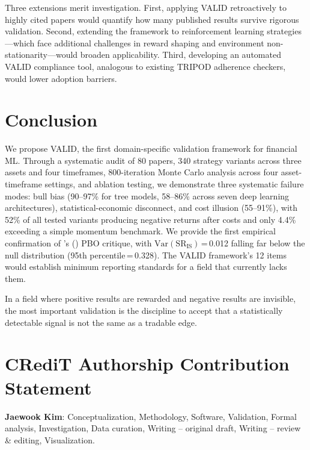\documentclass[preprint,12pt,authoryear]{elsarticle}
\begin{document}
Three extensions merit investigation. First, applying VALID retroactively to highly cited papers would quantify how many published results survive rigorous validation. Second, extending the framework to reinforcement learning strategies---which face additional challenges in reward shaping and environment non-stationarity---would broaden applicability. Third, developing an automated VALID compliance tool, analogous to existing TRIPOD adherence checkers, would lower adoption barriers.

\section{Conclusion}
\label{sec:conclusion}

We propose VALID, the first domain-specific validation framework for financial ML. Through a systematic audit of 80 papers, 340 strategy variants across three assets and four timeframes, 800-iteration Monte Carlo analysis across four asset-timeframe settings, and ablation testing, we demonstrate three systematic failure modes: bull bias (90--97\% for tree models, 58--86\% across seven deep learning architectures), statistical-economic disconnect, and cost illusion (55--91\%), with 52\% of all tested variants producing negative returns after costs and only 4.4\% exceeding a simple momentum benchmark. We provide the first empirical confirmation of \citeauthor{witzany2021bayesian}'s (\citeyear{witzany2021bayesian}) PBO critique, with $\mathrm{Var}(\mathrm{SR}_{\mathrm{IS}})$\,=\,0.012 falling far below the null distribution (95th percentile\,=\,0.328). The VALID framework's 12 items would establish minimum reporting standards for a field that currently lacks them.

In a field where positive results are rewarded and negative results are invisible, the most important validation is the discipline to accept that a statistically detectable signal is not the same as a tradable edge.

\section*{CRediT Authorship Contribution Statement}

\textbf{Jaewook Kim}: Conceptualization, Methodology, Software, Validation, Formal analysis, Investigation, Data curation, Writing -- original draft, Writing -- review \& editing, Visualization.
\end{document}
